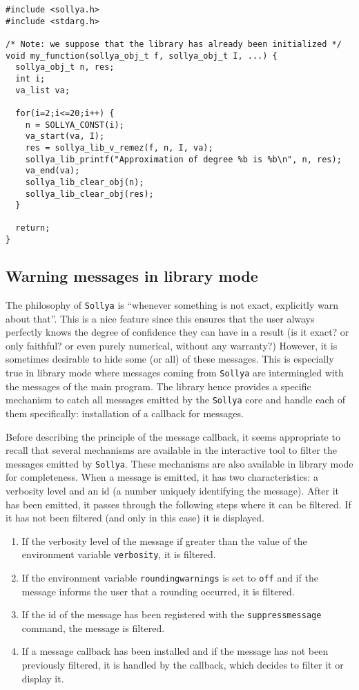 \documentclass[a4paper]{article}
\newcommand{\sollya}{\texttt{Sollya}\xspace}
\begin{document}
\begin{center}\begin{minipage}{15cm}\begin{Verbatim}[frame=single]
#include <sollya.h>
#include <stdarg.h>

/* Note: we suppose that the library has already been initialized */
void my_function(sollya_obj_t f, sollya_obj_t I, ...) {
  sollya_obj_t n, res;
  int i;
  va_list va;

  for(i=2;i<=20;i++) {
    n = SOLLYA_CONST(i);
    va_start(va, I);
    res = sollya_lib_v_remez(f, n, I, va);
    sollya_lib_printf("Approximation of degree %b is %b\n", n, res);
    va_end(va);
    sollya_lib_clear_obj(n);
    sollya_lib_clear_obj(res);
  }

  return;
}
\end{Verbatim}
\end{minipage}\end{center}

\subsection{Warning messages in library mode}
\label{callbacks}
The philosophy of \sollya is ``whenever something is not exact, explicitly warn about that''. This is a nice feature since this ensures that the user always perfectly knows the degree of confidence they can have in a result (is it exact? or only faithful? or even purely numerical, without any warranty?) However, it is sometimes desirable to hide some (or all) of these messages. This is especially true in library mode where messages coming from \sollya are intermingled with the messages of the main program. The library hence provides a specific mechanism to catch all messages emitted by the \sollya core and handle each of them specifically: installation of a callback for messages.

Before describing the principle of the message callback, it seems appropriate to recall that several mechanisms are available in the interactive tool to filter the messages emitted by \sollya. These mechanisms are also available in library mode for completeness. When a message is emitted, it has two characteristics: a verbosity level and an id (a number uniquely identifying the message). After it has been emitted, it passes through the following steps where it can be filtered. If it has not been filtered (and only in this case) it is displayed.
\begin{enumerate}
\item If the verbosity level of the message if greater than the value of the environment variable \verb|verbosity|, it is filtered.
\item If the environment variable \verb|roundingwarnings| is set to \verb|off| and if the message informs the user that a rounding occurred, it is filtered.
\item If the id of the message has been registered with the \verb|suppressmessage| command, the message is filtered.
\item If a message callback has been installed and if the message has not been previously filtered, it is handled by the callback, which decides to filter it or display it.
\end{enumerate}
\end{document}
